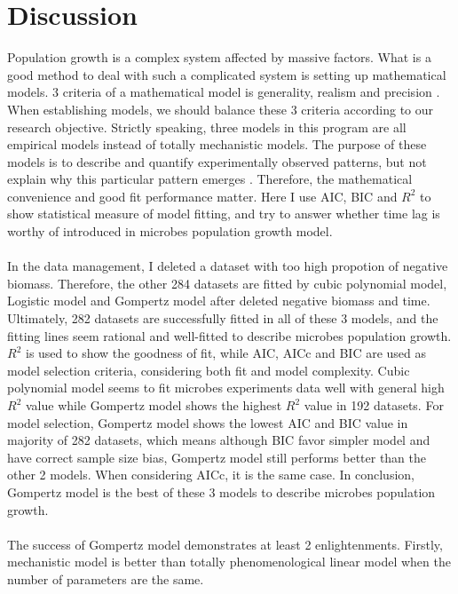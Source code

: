 \documentclass[11pt]{article}
\begin{document}
  \section{Discussion}
  Population growth is a complex system affected by massive factors. What is a good method to deal 
  with such a complicated system is setting up mathematical models. 3 criteria of a mathematical 
  model is generality, realism and precision \citep{RICHARDLEVINS1966TSOM}. When establishing 
  models, we should balance these 3 criteria according to our research objective. Strictly 
  speaking, three models in this program are all empirical models instead of totally mechanistic 
  models. The purpose of these models is to describe and quantify experimentally observed 
  patterns, but not explain why this particular pattern emerges \citep{Peleg2011}. Therefore, 
  the mathematical convenience and good fit performance matter. Here I use AIC, BIC and $R^2$ 
  to show statistical measure of model fitting, and try to answer whether time lag is worthy 
  of introduced in microbes population growth model.\\
  \\
  In the data management, I deleted a dataset with too high propotion of negative biomass. Therefore, the other 
  284 datasets are fitted by cubic polynomial model, Logistic model and Gompertz model after deleted negative 
  biomass and time. Ultimately, 282 datasets are successfully fitted in all of these 3 models, and the 
  fitting lines seem rational and well-fitted to describe microbes population growth. $R^2$ is used to show 
  the goodness of fit, while AIC, AICc and BIC are used as model selection criteria, considering both fit 
  and model complexity. Cubic polynomial model seems to fit microbes experiments data well with general high 
  $R^2$ value while Gompertz model shows the highest $R^2$ value in 192 datasets. For model selection, 
  Gompertz model shows the lowest AIC and BIC value in majority of 282 datasets, which means although BIC favor 
  simpler model and have correct sample size bias, Gompertz model still performs better than the other 2 models. 
  When considering AICc, it is the same case. In conclusion, Gompertz model is the best of these 3 models to 
  describe microbes population growth.\\
  \\
  The success of Gompertz model demonstrates at least 2 enlightenments. Firstly, mechanistic model is better 
  than totally phenomenological linear model when the number of parameters are the same. 
\end{document}
